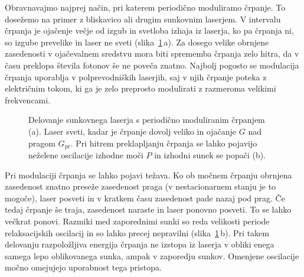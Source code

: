 Obravnavajmo najprej način, pri katerem periodično moduliramo črpanje.
To dosežemo na primer z bliskavico ali drugim sunkovnim laserjem. V 
intervalu 
črpanja je ojačenje večje od izgub in svetloba izhaja iz laserja, ko pa črpanja 
ni, so izgube prevelike in laser ne sveti (slika~\ref{fig:Gswitch}\,a). Za dosego velike
obrnjene zasedenosti v ojačevalnem sredstvu mora biti sprememba črpanja zelo hitra, 
da v času preklopa števila fotonov še ne poveča znatno. 
Najbolj pogosto se modulacija črpanja uporablja
v polprevodniških laserjih, saj v njih črpanje poteka z električnim tokom, ki 
ga je zelo preprosto modulirati z razmeroma velikimi frekvencami. 
\begin{figure}[h]
\centering
\def\svgwidth{140truemm} 

\caption{Delovanje sunkovnega laserja s periodično moduliranim črpanjem (a). Laser sveti,
kadar je črpanje dovolj veliko in ojačanje $G$ nad pragom $G_{\mathrm{pr}}$. 
Pri hitrem preklapljanju črpanja se lahko pojavijo neželene oscilacije izhodne moči $P$ in 
izhodni sunek se popači (b).}
\label{fig:Gswitch}
\end{figure}

Pri modulaciji črpanja se lahko pojavi težava. Ko ob močnem črpanju 
obrnjena zasedenost znatno preseže zasedenost praga (v nestacionarnem stanju 
je to mogoče), laser posveti in v kratkem času zasedenost pade nazaj pod prag. 
Če tedaj črpanje še traja, zasedenost naraste in laser ponovno posveti. 
To se lahko večkrat ponovi. Razmiki med zaporednimi sunki
so reda velikosti periode relaksacijskih oscilacij in so lahko precej
nepravilni  (slika~\ref{fig:Gswitch}\,b). Pri takem delovanju
razpoložljiva energija črpanja ne izstopa iz laserja v obliki enega samega lepo oblikovanega sunka, 
ampak v zaporedju sunkov. Omenjene oscilacije močno omejujejo uporabnost tega pristopa.

